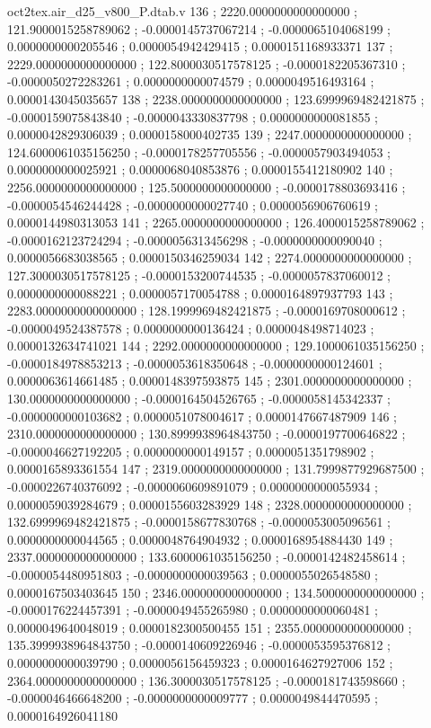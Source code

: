 \begin{filecontents}[overwrite]{oct2tex.air_d25_v800_P.dtab.v}
136 ; 2220.0000000000000000 ; 121.9000015258789062 ; -0.0000145737067214 ; -0.0000065104068199 ; 0.0000000000205546 ; 0.0000054942429415 ; 0.0000151168933371
137 ; 2229.0000000000000000 ; 122.8000030517578125 ; -0.0000182205367310 ; -0.0000050272283261 ; 0.0000000000074579 ; 0.0000049516493164 ; 0.0000143045035657
138 ; 2238.0000000000000000 ; 123.6999969482421875 ; -0.0000159075843840 ; -0.0000043330837798 ; 0.0000000000081855 ; 0.0000042829306039 ; 0.0000158000402735
139 ; 2247.0000000000000000 ; 124.6000061035156250 ; -0.0000178257705556 ; -0.0000057903494053 ; 0.0000000000025921 ; 0.0000068040853876 ; 0.0000155412180902
140 ; 2256.0000000000000000 ; 125.5000000000000000 ; -0.0000178803693416 ; -0.0000054546244428 ; -0.0000000000027740 ; 0.0000056906760619 ; 0.0000144980313053
141 ; 2265.0000000000000000 ; 126.4000015258789062 ; -0.0000162123724294 ; -0.0000056313456298 ; -0.0000000000090040 ; 0.0000056683038565 ; 0.0000150346259034
142 ; 2274.0000000000000000 ; 127.3000030517578125 ; -0.0000153200744535 ; -0.0000057837060012 ; 0.0000000000088221 ; 0.0000057170054788 ; 0.0000164897937793
143 ; 2283.0000000000000000 ; 128.1999969482421875 ; -0.0000169708000612 ; -0.0000049524387578 ; 0.0000000000136424 ; 0.0000048498714023 ; 0.0000132634741021
144 ; 2292.0000000000000000 ; 129.1000061035156250 ; -0.0000184978853213 ; -0.0000053618350648 ; -0.0000000000124601 ; 0.0000063614661485 ; 0.0000148397593875
145 ; 2301.0000000000000000 ; 130.0000000000000000 ; -0.0000164504526765 ; -0.0000058145342337 ; -0.0000000000103682 ; 0.0000051078004617 ; 0.0000147667487909
146 ; 2310.0000000000000000 ; 130.8999938964843750 ; -0.0000197700646822 ; -0.0000046627192205 ; 0.0000000000149157 ; 0.0000051351798902 ; 0.0000165893361554
147 ; 2319.0000000000000000 ; 131.7999877929687500 ; -0.0000226740376092 ; -0.0000060609891079 ; 0.0000000000055934 ; 0.0000059039284679 ; 0.0000155603283929
148 ; 2328.0000000000000000 ; 132.6999969482421875 ; -0.0000158677830768 ; -0.0000053005096561 ; 0.0000000000044565 ; 0.0000048764904932 ; 0.0000168954884430
149 ; 2337.0000000000000000 ; 133.6000061035156250 ; -0.0000142482458614 ; -0.0000054480951803 ; -0.0000000000039563 ; 0.0000055026548580 ; 0.0000167503403645
150 ; 2346.0000000000000000 ; 134.5000000000000000 ; -0.0000176224457391 ; -0.0000049455265980 ; 0.0000000000060481 ; 0.0000049640048019 ; 0.0000182300500455
151 ; 2355.0000000000000000 ; 135.3999938964843750 ; -0.0000140609226946 ; -0.0000053595376812 ; 0.0000000000039790 ; 0.0000056156459323 ; 0.0000164627927006
152 ; 2364.0000000000000000 ; 136.3000030517578125 ; -0.0000181743598660 ; -0.0000046466648200 ; -0.0000000000009777 ; 0.0000049844470595 ; 0.0000164926041180

\end{filecontents}
